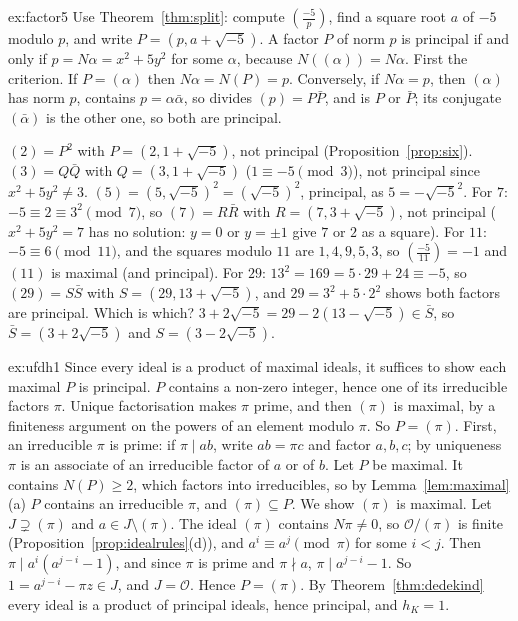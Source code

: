 \begin{solution}{ex:factor5}
\idea Use Theorem~\ref{thm:split}: compute $\left(\frac{-5}p\right)$, find a square root $a$ of $-5$ modulo $p$, and write $P=(p,a+\sqrt{-5})$. A factor $P$ of norm $p$ is principal if and only if $p=N\alpha=x^2+5y^2$ for some $\alpha$, because $N((\alpha))=N\alpha$.
\writeup First the criterion. If $P=(\alpha)$ then $N\alpha=N(P)=p$. Conversely, if $N\alpha=p$, then $(\alpha)$ has norm $p$, contains $p=\alpha\bar\alpha$, so divides $(p)=P\bar P$, and is $P$ or $\bar P$; its conjugate $(\bar\alpha)$ is the other one, so both are principal.

$(2)=P^2$ with $P=(2,1+\sqrt{-5})$, not principal (Proposition~\ref{prop:six}). $(3)=Q\bar Q$ with $Q=(3,1+\sqrt{-5})$ ($1\equiv-5\pmod3$), not principal since $x^2+5y^2\ne3$. $(5)=(5,\sqrt{-5})^2=(\sqrt{-5})^2$, principal, as $5=-\sqrt{-5}^2$. For $7$: $-5\equiv2\equiv3^2\pmod7$, so $(7)=R\bar R$ with $R=(7,3+\sqrt{-5})$, not principal ($x^2+5y^2=7$ has no solution: $y=0$ or $y=\pm1$ give $7$ or $2$ as a square). For $11$: $-5\equiv6\pmod{11}$, and the squares modulo $11$ are $1,4,9,5,3$, so $\left(\frac{-5}{11}\right)=-1$ and $(11)$ is maximal (and principal). For $29$: $13^2=169=5\cdot29+24\equiv-5$, so $(29)=S\bar S$ with $S=(29,13+\sqrt{-5})$, and $29=3^2+5\cdot2^2$ shows both factors are principal. Which is which? $3+2\sqrt{-5}=29-2(13-\sqrt{-5})\in\bar S$, so $\bar S=(3+2\sqrt{-5})$ and $S=(3-2\sqrt{-5})$.
\end{solution}

\begin{solution}{ex:ufdh1}
\idea Since every ideal is a product of maximal ideals, it suffices to show each maximal $P$ is principal. $P$ contains a non-zero integer, hence one of its irreducible factors $\pi$. Unique factorisation makes $\pi$ prime, and then $(\pi)$ is maximal, by a finiteness argument on the powers of an element modulo $\pi$. So $P=(\pi)$.
\writeup First, an irreducible $\pi$ is prime: if $\pi\mid ab$, write $ab=\pi c$ and factor $a,b,c$; by uniqueness $\pi$ is an associate of an irreducible factor of $a$ or of $b$. Let $P$ be maximal. It contains $N(P)\ge2$, which factors into irreducibles, so by Lemma~\ref{lem:maximal}(a) $P$ contains an irreducible $\pi$, and $(\pi)\subseteq P$. We show $(\pi)$ is maximal. Let $J\supsetneq(\pi)$ and $a\in J\setminus(\pi)$. The ideal $(\pi)$ contains $N\pi\ne0$, so $\mathcal O/(\pi)$ is finite (Proposition~\ref{prop:idealrules}(d)), and $a^i\equiv a^j\pmod\pi$ for some $i<j$. Then $\pi\mid a^i(a^{j-i}-1)$, and since $\pi$ is prime and $\pi\nmid a$, $\pi\mid a^{j-i}-1$. So $1=a^{j-i}-\pi z\in J$, and $J=\mathcal O$. Hence $P=(\pi)$. By Theorem~\ref{thm:dedekind} every ideal is a product of principal ideals, hence principal, and $h_K=1$.
\end{solution}

